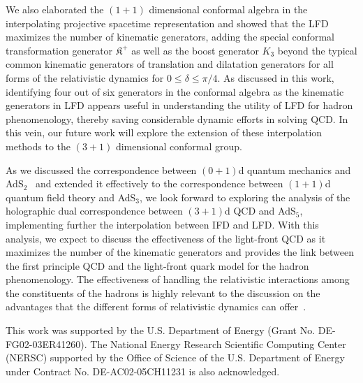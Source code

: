 \documentclass[%
 reprint,
superscriptaddress,
 amsmath,amssymb,
 aps,
]{revtex4-2}
\begin{document}
We also elaborated the $(1+1)$ dimensional conformal algebra in the interpolating projective spacetime representation and showed that the LFD maximizes the number of kinematic generators, adding the special conformal transformation  generator $\mathfrak{K}^{+}$
as well as the boost generator $K_3$ beyond the typical common kinematic generators of translation and dilatation generators for all forms of the relativistic dynamics for $0 \le \delta \le \pi/4$. 
As discussed in this work, identifying four out of six generators in the conformal algebra as the kinematic generators in LFD appears useful in understanding the utility of LFD for hadron phenomenology, thereby saving considerable dynamic efforts in solving QCD. In this vein, our future work will explore the extension of these interpolation methods to the $(3+1)$  dimensional conformal group. 

As we discussed the correspondence between $(0+1)$d quantum mechanics and AdS$_2$~\cite{Fubini1976} and extended it effectively to the correspondence between $(1+1)$d quantum field theory and AdS$_3$, we look forward to exploring the analysis of the holographic dual correspondence between $(3+1)$d QCD and AdS$_5$, implementing further the interpolation between IFD and LFD. With this analysis, we expect to discuss the effectiveness of the light-front QCD as it maximizes the number of the kinematic generators and provides the link between the first principle QCD and the light-front quark model for the hadron phenomenology. The effectiveness of handling the relativistic interactions among the constituents of the hadrons is highly relevant to the discussion on the advantages that the different forms of relativistic dynamics can offer~\cite{Ji2025}.

\acknowledgments
This work was supported by the U.S. Department of Energy (Grant No. DE-FG02-03ER41260).
The National Energy Research Scientific Computing Center (NERSC) supported by the Office of Science of the U.S. Department of Energy under Contract No. DE-AC02-05CH11231 is also acknowledged. 

\appendix
\end{document}
